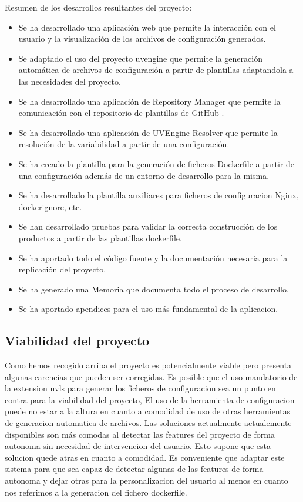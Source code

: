 \documentclass[12pt, a4paper, twoside]{article}
\begin{document}
\newpage 

Resumen de los desarrollos resultantes del proyecto:
\begin{itemize}
	\item Se ha desarrollado una aplicación web que permite la interacción con el usuario y la visualización de los archivos de configuración generados.
	\item Se adaptado el uso del proyecto uvengine que permite la generación automática de archivos de configuración a partir de plantillas adaptandola a las necesidades del proyecto.
	\item Se ha desarrollado una aplicación de Repository Manager que permite la comunicación con el repositorio de plantillas de GitHub \cite{m4rdom_templates} .
	\item Se ha desarrollado una aplicación de UVEngine Resolver que permite la resolución de la variabilidad a partir de una configuración.
	\item Se ha creado la plantilla para la generación de ficheros Dockerfile a partir de una configuración además de un entorno de desarrollo para la misma.
	\item Se ha desarrollado la plantilla auxiliares para ficheros de configuracion Nginx, dockerignore, etc.
	\item Se han desarrollado pruebas para validar la correcta construcción de los productos a partir de las plantillas dockerfile.
	\item Se ha aportado todo el código fuente y la documentación necesaria para la replicación del proyecto.
	\item Se ha generado una Memoria que documenta todo el proceso de desarrollo.
	\item Se ha aportado apendices para el uso más fundamental de la aplicacion.
\end{itemize}

\subsection{Viabilidad del proyecto}
Como hemos recogido arriba el proyecto es potencialmente viable pero presenta algunas carencias que pueden ser corregidas.
Es posible que el uso mandatorio de la extension uvls para generar los ficheros de configuracion sea un punto en contra para la viabilidad del proyecto, 
El uso de la herramienta de configuracion puede no estar a la altura en cuanto a comodidad de uso de otras herramientas de generacion automatica de archivos.
Las soluciones actualmente actualemente disponibles son más comodas al detectar las features del proyecto de forma autonoma sin necesidad de intervencion del usuario. Esto supone que esta solucion quede atras en cuanto a comodidad. 
Es conveniente que adaptar este sistema para que sea capaz de detectar algunas de las features de forma autonoma y dejar otras para la personalizacion del usuario al menos en cuanto nos referimos a la generacion del fichero dockerfile.
\end{document}
